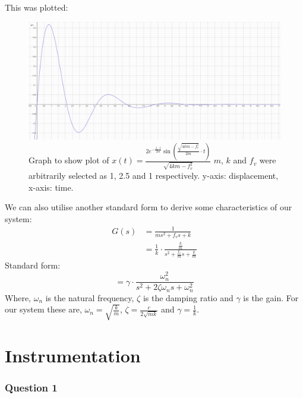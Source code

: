 \documentclass[12pt]{article}
\numberwithin{equation}{section}
\begin{document}
This was plotted:
\begin{figure}[H]
  \centering
  \includegraphics[width=\textwidth]{./img/3-2timeresponsedamped.png}
  \caption{Graph to show plot of $x(t) = \frac{2e^{-\frac{f_v \cdot t}{2m}}\sin{\left(\frac{\sqrt{4km-f_v^2 }}{2m} \cdot t\right)}}{\sqrt{4km - f_v^2}}$ $m$, $k$ and $f_v$ were arbitrarily selected as 1, 2.5 and 1 respectively. y-axis: displacement, x-axis: time.}
\end{figure}
We can also utilise another standard form to derive some characteristics of our system:
\begin{align}
  G(s) &= \frac{1}{ms^2 + f_v s + k}\\
  &= \frac{1}{k} \cdot \frac{\frac{k}{m}}{s^2 + \frac{f_v}{m}s + \frac{k}{m}}
\end{align}
Standard form:
\begin{equation}
  = \gamma \cdot \frac{\omega_n^2}{s^2 + 2\zeta \omega_n s + \omega_n^2}
\end{equation}
Where, $\omega_n$ is the natural frequency, $\zeta$ is the damping ratio and $\gamma$ is the gain. For our system these are,  $\omega_n = \sqrt{\frac{k}{m}}$, $\zeta = \frac{c}{2\sqrt{mk}}$ and $\gamma = \frac{1}{k}$.
\part{Instrumentation}
\section{Question 1}
\end{document}
